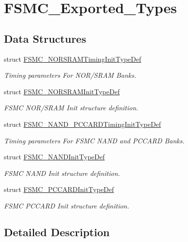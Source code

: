 \hypertarget{group___f_s_m_c___exported___types}{}\section{F\+S\+M\+C\+\_\+\+Exported\+\_\+\+Types}
\label{group___f_s_m_c___exported___types}
\subsection*{Data Structures}
\begin{DoxyCompactItemize}
\item 
struct \mbox{\hyperlink{struct_f_s_m_c___n_o_r_s_r_a_m_timing_init_type_def}{F\+S\+M\+C\+\_\+\+N\+O\+R\+S\+R\+A\+M\+Timing\+Init\+Type\+Def}}
\begin{DoxyCompactList}\small\item\em Timing parameters For N\+O\+R/\+S\+R\+AM Banks. \end{DoxyCompactList}\item 
struct \mbox{\hyperlink{struct_f_s_m_c___n_o_r_s_r_a_m_init_type_def}{F\+S\+M\+C\+\_\+\+N\+O\+R\+S\+R\+A\+M\+Init\+Type\+Def}}
\begin{DoxyCompactList}\small\item\em F\+S\+MC N\+O\+R/\+S\+R\+AM Init structure definition. \end{DoxyCompactList}\item 
struct \mbox{\hyperlink{struct_f_s_m_c___n_a_n_d___p_c_c_a_r_d_timing_init_type_def}{F\+S\+M\+C\+\_\+\+N\+A\+N\+D\+\_\+\+P\+C\+C\+A\+R\+D\+Timing\+Init\+Type\+Def}}
\begin{DoxyCompactList}\small\item\em Timing parameters For F\+S\+MC N\+A\+ND and P\+C\+C\+A\+RD Banks. \end{DoxyCompactList}\item 
struct \mbox{\hyperlink{struct_f_s_m_c___n_a_n_d_init_type_def}{F\+S\+M\+C\+\_\+\+N\+A\+N\+D\+Init\+Type\+Def}}
\begin{DoxyCompactList}\small\item\em F\+S\+MC N\+A\+ND Init structure definition. \end{DoxyCompactList}\item 
struct \mbox{\hyperlink{struct_f_s_m_c___p_c_c_a_r_d_init_type_def}{F\+S\+M\+C\+\_\+\+P\+C\+C\+A\+R\+D\+Init\+Type\+Def}}
\begin{DoxyCompactList}\small\item\em F\+S\+MC P\+C\+C\+A\+RD Init structure definition. \end{DoxyCompactList}\end{DoxyCompactItemize}


\subsection{Detailed Description}
